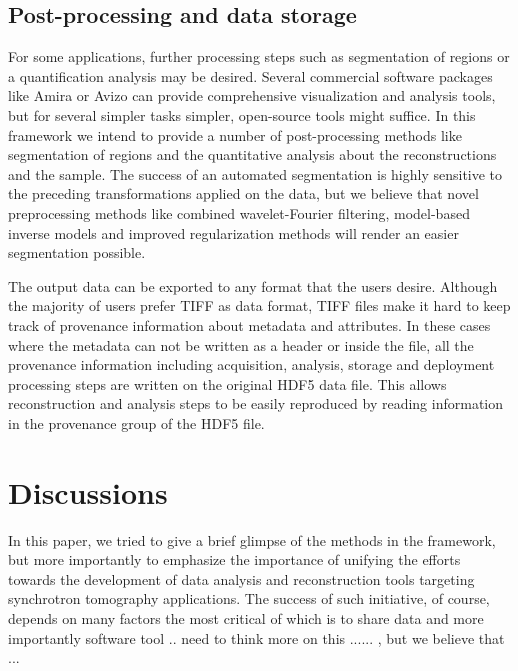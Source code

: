 \documentclass[pdf]{iucr}              %
\begin{document}
\subsection{Post-processing and data storage}

For some applications, further processing steps such as segmentation of regions or a quantification analysis may be desired. Several commercial software packages like Amira or Avizo \cite{amira_avizo} can provide comprehensive visualization and analysis tools, but for several simpler tasks simpler, open-source tools might suffice. In this framework we intend to provide a number of post-processing methods like segmentation of regions and  the quantitative analysis about the reconstructions and the sample. The success of an automated segmentation is highly sensitive to the preceding transformations applied on the data, but we believe that novel preprocessing methods like combined wavelet-Fourier filtering, model-based inverse models and improved regularization methods will render an easier segmentation possible. 

The output data can be exported to any format that the users desire. Although the majority of users prefer TIFF as data format, TIFF files make it hard to keep track of provenance information about metadata and attributes. In these cases where the metadata can not be written as a header or inside the file, all the provenance information including acquisition, analysis, storage and deployment processing steps are written on the original HDF5 data file. This allows reconstruction and analysis steps to be easily reproduced by reading information in the provenance group of the HDF5 file. 


\section{Discussions}

In this paper, we tried to give a brief glimpse of the methods in the framework, but more importantly to emphasize the importance of unifying the efforts towards the development of data analysis and reconstruction tools targeting synchrotron tomography applications. The success of such initiative, of course, depends on many factors the most critical of which is to share data and more importantly software tool .. need to think more on this ...... , but we believe that ...

\end{document}
